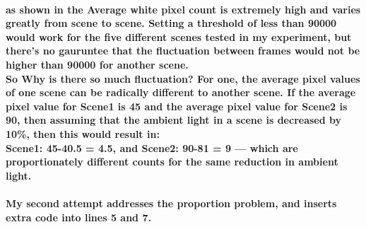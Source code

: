 \paragraph{as shown in  the Average white pixel count is extremely high and varies greatly from scene to scene. Setting a threshold of less than 90000 would work for the five different scenes tested in my experiment, but there’s no gauruntee that the fluctuation between frames would not be higher than 90000 for another scene. \\
So Why is there so much fluctuation? For one, the average pixel values of one scene can be radically different to another scene. If the average pixel value for Scene1 is 45 and the average pixel value for Scene2 is 90, then assuming that the ambient light in a scene is decreased by 10\%, then this would result in:\\
Scene1:  45-40.5 = 4.5, and Scene2: 90-81 = 9 --- which are proportionately different counts for the same reduction in ambient light.\\
 }
\paragraph{My second attempt addresses the proportion problem, and inserts extra code into lines 5 and 7.}
\begin{frame}[fragile]

\end{frame}
